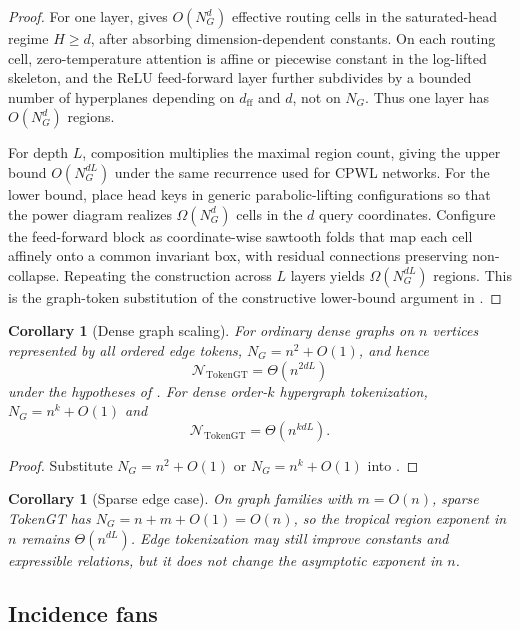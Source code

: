 \documentclass[11pt]{article}
\newtheorem{corollary}[theorem]{Corollary}
\begin{document}
\begin{proof}
For one layer,  gives $O(N_G^d)$ effective routing cells in the saturated-head regime $H\ge d$, after absorbing dimension-dependent constants.  On each routing cell, zero-temperature attention is affine or piecewise constant in the log-lifted skeleton, and the ReLU feed-forward layer further subdivides by a bounded number of hyperplanes depending on $d_{\mathrm{ff}}$ and $d$, not on $N_G$.  Thus one layer has $O(N_G^d)$ regions.

For depth $L$, composition multiplies the maximal region count, giving the upper bound $O(N_G^{dL})$ under the same recurrence used for CPWL networks.  For the lower bound, place head keys in generic parabolic-lifting configurations so that the power diagram realizes $\Omega(N_G^d)$ cells in the $d$ query coordinates.  Configure the feed-forward block as coordinate-wise sawtooth folds that map each cell affinely onto a common invariant box, with residual connections preserving non-collapse.  Repeating the construction across $L$ layers yields $\Omega(N_G^{dL})$ regions.  This is the graph-token substitution of the constructive lower-bound argument in \cite{su2026tropicalexpressivity}.
\end{proof}

\begin{corollary}[Dense graph scaling]
\label{cor:dense-scaling}
For ordinary dense graphs on $n$ vertices represented by all ordered edge tokens, $N_G=n^2+O(1)$, and hence
\[
  \mathcal{N}_{\mathrm{TokenGT}}=\Theta(n^{2dL})
\]
under the hypotheses of .  For dense order-$k$ hypergraph tokenization, $N_G=n^k+O(1)$ and
\[
  \mathcal{N}_{\mathrm{TokenGT}}=\Theta(n^{kdL}).
\]
\end{corollary}

\begin{proof}
Substitute $N_G=n^2+O(1)$ or $N_G=n^k+O(1)$ into .
\end{proof}

\begin{corollary}[Sparse edge case]
\label{cor:sparse-edge}
On graph families with $m=O(n)$, sparse TokenGT has $N_G=n+m+O(1)=O(n)$, so the tropical region exponent in $n$ remains $\Theta(n^{dL})$.  Edge tokenization may still improve constants and expressible relations, but it does not change the asymptotic exponent in $n$.
\end{corollary}

\subsection{Incidence fans}
\end{document}
